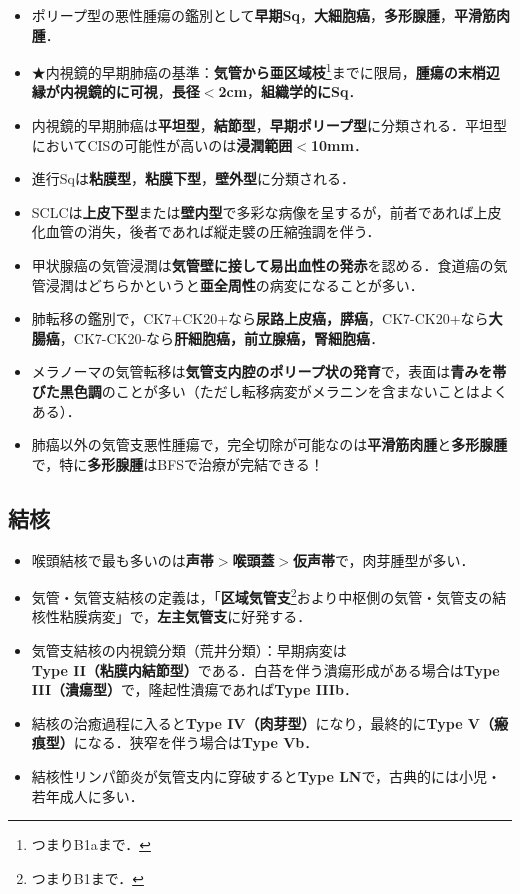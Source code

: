 \begin{itemize}

\item ポリープ型の悪性腫瘍の鑑別として\textbf{早期Sq}，\textbf{大細胞癌}，\textbf{多形腺腫}，\textbf{平滑筋肉腫}．

\item ★内視鏡的早期肺癌の基準：\textbf{気管から亜区域枝}\footnote{つまりB1aまで．}までに限局，\textbf{腫瘍の末梢辺縁が内視鏡的に可視}，\textbf{長径$<$2cm}，\textbf{組織学的にSq}．
\item 内視鏡的早期肺癌は\textbf{平坦型}，\textbf{結節型}，\textbf{早期ポリープ型}に分類される．平坦型においてCISの可能性が高いのは\textbf{浸潤範囲$<$10mm}．
\item 進行Sqは\textbf{粘膜型}，\textbf{粘膜下型}，\textbf{壁外型}に分類される．
\item SCLCは\textbf{上皮下型}または\textbf{壁内型}で多彩な病像を呈するが，前者であれば上皮化血管の消失，後者であれば縦走襞の圧縮強調を伴う．


\item 甲状腺癌の気管浸潤は\textbf{気管壁に接して易出血性の発赤}を認める．食道癌の気管浸潤はどちらかというと\textbf{亜全周性}の病変になることが多い．

\item 肺転移の鑑別で，CK7+CK20+なら\textbf{尿路上皮癌，膵癌}，CK7-CK20+なら\textbf{大腸癌}，CK7-CK20-なら\textbf{肝細胞癌，前立腺癌，腎細胞癌}．
\item メラノーマの気管転移は\textbf{気管支内腔のポリープ状の発育}で，表面は\textbf{青みを帯びた黒色調}のことが多い（ただし転移病変がメラニンを含まないことはよくある）．

\item 肺癌以外の気管支悪性腫瘍で，完全切除が可能なのは\textbf{平滑筋肉腫}と\textbf{多形腺腫}で，特に\textbf{多形腺腫}はBFSで治療が完結できる！
\end{itemize}




\subsection{結核}
\begin{itemize}

\item 喉頭結核で最も多いのは\textbf{声帯$>$喉頭蓋$>$仮声帯}で，肉芽腫型が多い．
\item 気管・気管支結核の定義は，「\textbf{区域気管支}\footnote{つまりB1まで．}おより中枢側の気管・気管支の結核性粘膜病変」で，\textbf{左主気管支}に好発する．
\item 気管支結核の内視鏡分類（荒井分類）：早期病変は\textbf{Type II（粘膜内結節型）}である．白苔を伴う潰瘍形成がある場合は\textbf{Type III（潰瘍型）}で，隆起性潰瘍であれば\textbf{Type IIIb}．
\item 結核の治癒過程に入ると\textbf{Type IV（肉芽型）}になり，最終的に\textbf{Type V（瘢痕型）}になる．狭窄を伴う場合は\textbf{Type Vb}．

\item 結核性リンパ節炎が気管支内に穿破すると\textbf{Type LN}で，古典的には小児・若年成人に多い．

\end{itemize}


